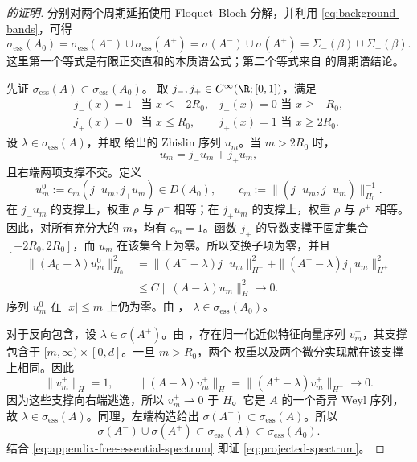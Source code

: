 \begin{proof}[ 的证明]
分别对两个周期延拓使用 Floquet--Bloch 分解，并利用
\eqref{eq:background-bands}，可得
\begin{equation}
  \sigma_{\mathrm{ess}}(A_0)
  =\sigma_{\mathrm{ess}}(A^-)
   \cup\sigma_{\mathrm{ess}}(A^+)
  =\sigma(A^-)\cup\sigma(A^+)
  =\Sigma_-(\beta)\cup\Sigma_+(\beta).
  \label{eq:appendix-free-essential-spectrum}
\end{equation}
这里第一个等式是有限正交直和的本质谱公式；第二个等式来自
\cite[Proposition~3.1, especially equations~(3.3)--(3.4)]{Fliss2013}
的周期谱结论。

先证
$\sigma_{\mathrm{ess}}(A)\subset\sigma_{\mathrm{ess}}(A_0)$。
取 $j_-,j_+\in C^\infty(\R;[0,1])$，满足
\[
\begin{array}{lll}
  j_-(x)=1&\text{当 }x\leq-2R_0,&
  j_-(x)=0\text{ 当 }x\geq-R_0,\\
  j_+(x)=0&\text{当 }x\leq R_0,&
  j_+(x)=1\text{ 当 }x\geq2R_0.
\end{array}
\]
设 $\lambda\in\sigma_{\mathrm{ess}}(A)$，并取
 给出的 Zhislin 序列 $u_m$。当
$m>2R_0$ 时，
\[
  u_m=j_-u_m+j_+u_m,
\]
且右端两项支撑不交。定义
\[
  u_m^0:=c_m(j_-u_m,j_+u_m)\in D(A_0),
  \qquad
  c_m:=\|(j_-u_m,j_+u_m)\|_{H_0}^{-1}.
\]
在 $j_-u_m$ 的支撑上，权重 $\rho$ 与 $\rho^-$ 相等；在
$j_+u_m$ 的支撑上，权重 $\rho$ 与 $\rho^+$ 相等。因此，对所有充分大的
$m$，均有 $c_m=1$。函数 $j_\pm$ 的导数支撑于固定集合
$[-2R_0,2R_0]$，而 $u_m$ 在该集合上为零。所以交换子项为零，并且
\[
\begin{aligned}
  \|(A_0-\lambda)u_m^0\|_{H_0}^2
  &=\|(A^--\lambda)j_-u_m\|_{H^-}^2
    +\|(A^+-\lambda)j_+u_m\|_{H^+}^2\\
  &\leq C\|(A-\lambda)u_m\|_H^2\longrightarrow0.
\end{aligned}
\]
序列 $u_m^0$ 在 $|x|\leq m$ 上仍为零。由
，
$\lambda\in\sigma_{\mathrm{ess}}(A_0)$。

对于反向包含，设 $\lambda\in\sigma(A^+)$。由
，存在归一化近似特征向量序列
$v_m^+$，其支撑包含于 $[m,\infty)\times[0,d]$。一旦 $m>R_0$，两个
权重以及两个微分实现就在该支撑上相同。因此
\[
  \|v_m^+\|_H=1,\qquad
  \|(A-\lambda)v_m^+\|_H
  =\|(A^+-\lambda)v_m^+\|_{H^+}\longrightarrow0.
\]
因为这些支撑向右端逃逸，所以 $v_m^+\rightharpoonup0$ 于 $H$。它是
$A$ 的一个奇异 Weyl 序列，故
$\lambda\in\sigma_{\mathrm{ess}}(A)$。同理，左端构造给出
$\sigma(A^-)\subset\sigma_{\mathrm{ess}}(A)$。所以
\[
  \sigma(A^-)\cup\sigma(A^+)
  \subset\sigma_{\mathrm{ess}}(A)
  \subset\sigma_{\mathrm{ess}}(A_0).
\]
结合 \eqref{eq:appendix-free-essential-spectrum} 即证
\eqref{eq:projected-spectrum}。
\end{proof}
